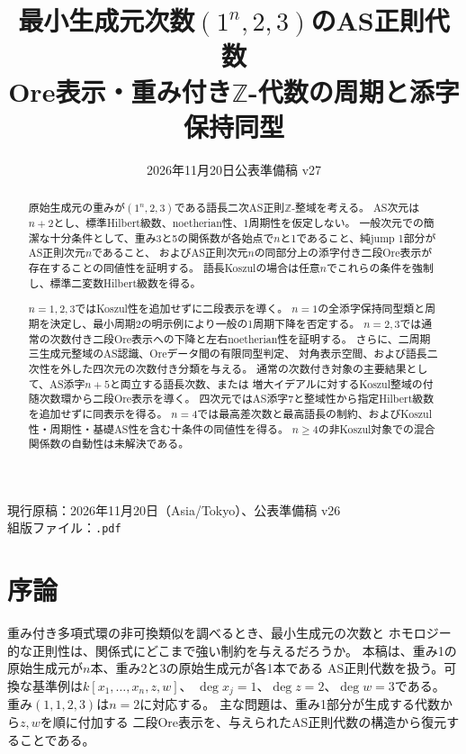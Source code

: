 \documentclass[11pt,a4paper]{ltjsarticle}
\title{最小生成元次数$(1^n,2,3)$のAS正則代数\\
\large Ore表示・重み付き$\mathbb Z$-代数の周期と添字保持同型}
\author{}
\date{2026年11月20日\quad 公表準備稿 v27}
\theoremstyle{definition}
\begin{document}
\hypersetup{pageanchor=false}
\begin{titlepage}
\maketitle
\thispagestyle{empty}
\begin{abstract}
原始生成元の重みが$(1^n,2,3)$である語長二次AS正則$\mathbb Z$-整域を考える。
AS次元は$n+2$とし、標準Hilbert級数、noetherian性、1周期性を仮定しない。
一般次元での簡潔な十分条件として、重み3と5の関係数が各始点で$n$と1であること、純jump 1部分がAS正則次元$n$であること、
およびAS正則次元$n$の同部分上の添字付き二段Ore表示が存在することの同値性を証明する。
語長Koszulの場合は任意$n$でこれらの条件を強制し、標準二変数Hilbert級数を得る。

$n=1,2,3$ではKoszul性を追加せずに二段表示を導く。
$n=1$の全添字保持同型類と周期を決定し、最小周期2の明示例により一般の1周期下降を否定する。
$n=2,3$では通常の次数付き二段Ore表示への下降と左右noetherian性を証明する。
さらに、二周期三生成元整域のAS認識、Oreデータ間の有限同型判定、
対角表示空間、および語長二次性を外した四次元の次数付き分類を与える。
通常の次数付き対象の主要結果として、AS添字$n+5$と両立する語長次数、または
増大イデアルに対するKoszul整域の付随次数環から二段Ore表示を導く。
四次元ではAS添字7と整域性から指定Hilbert級数を追加せずに同表示を得る。
$n=4$では最高差次数と最高語長の制約、およびKoszul性・周期性・基礎AS性を含む十条件の同値性を得る。
$n\ge4$の非Koszul対象での混合関係数の自動性は未解決である。
\end{abstract}
\vfill
\begin{center}
現行原稿：2026年11月20日（Asia/Tokyo）、公表準備稿 v26\\
組版ファイル：\texttt{\jobname.pdf}
\end{center}
\end{titlepage}
\hypersetup{pageanchor=true}
\setcounter{tocdepth}{1}
\tableofcontents
\clearpage
{}

\section{序論}\label{sec:introduction}
重み付き多項式環の非可換類似を調べるとき、最小生成元の次数と
ホモロジー的な正則性は、関係式にどこまで強い制約を与えるだろうか。
本稿は、重み1の原始生成元が$n$本、重み2と3の原始生成元が各1本である
AS正則代数を扱う。可換な基準例は$k[x_1,\ldots,x_n,z,w]$、
$\deg x_j=1$、$\deg z=2$、$\deg w=3$である。
重み$(1,1,2,3)$は$n=2$に対応する。
主な問題は、重み1部分が生成する代数から$z,w$を順に付加する
二段Ore表示を、与えられたAS正則代数の構造から復元することである。
\end{document}
